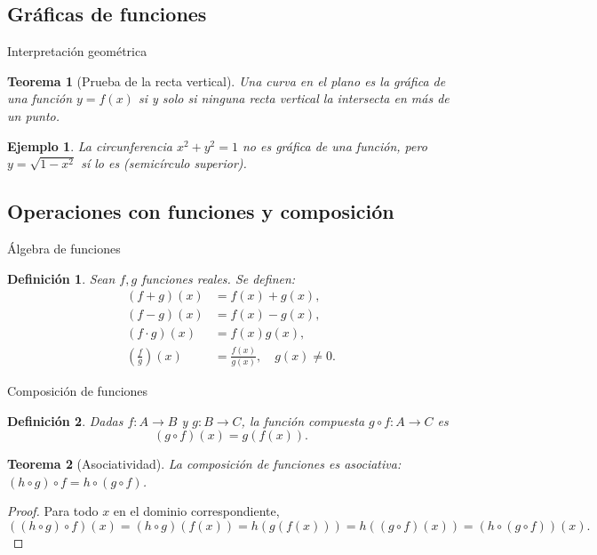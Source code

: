 \documentclass[10pt, spanish]{beamer}
\newtheorem{definicion}{Definición}
\newtheorem{teorema}{Teorema}
\newtheorem{ejemplo}{Ejemplo}
\begin{document}
	\subsection{Gráficas de funciones}
	\begin{frame}{Interpretación geométrica}
		\begin{teorema}[Prueba de la recta vertical]
			Una curva en el plano es la gráfica de una función $y=f(x)$ si y solo si ninguna recta vertical la intersecta en más de un punto.
		\end{teorema}
		\begin{ejemplo}
			La circunferencia $x^2+y^2=1$ no es gráfica de una función, pero $y=\sqrt{1-x^2}$ sí lo es (semicírculo superior).
		\end{ejemplo}
	\end{frame}
	
	\subsection{Operaciones con funciones y composición}
	\begin{frame}{Álgebra de funciones}
		\begin{definicion}
			Sean $f,g$ funciones reales. Se definen:
			\begin{align*}
				(f+g)(x) &= f(x)+g(x),\\
				(f-g)(x) &= f(x)-g(x),\\
				(f\cdot g)(x) &= f(x)g(x),\\
				\left(\frac{f}{g}\right)(x) &= \frac{f(x)}{g(x)},\quad g(x)\neq0.
			\end{align*}
		\end{definicion}
	\end{frame}
	
	\begin{frame}{Composición de funciones}
		\begin{definicion}
			Dadas $f:A\to B$ y $g:B\to C$, la \textit{función compuesta} $g\circ f:A\to C$ es
			\[
			(g\circ f)(x) = g(f(x)).
			\]
		\end{definicion}
		\begin{teorema}[Asociatividad]
			La composición de funciones es asociativa: $(h\circ g)\circ f = h\circ (g\circ f)$.
		\end{teorema}
		\begin{proof}
			Para todo $x$ en el dominio correspondiente,
			\[
			((h\circ g)\circ f)(x) = (h\circ g)(f(x)) = h(g(f(x))) = h((g\circ f)(x)) = (h\circ (g\circ f))(x).
			\]
		\end{proof}
	\end{frame}
	
\end{document}
